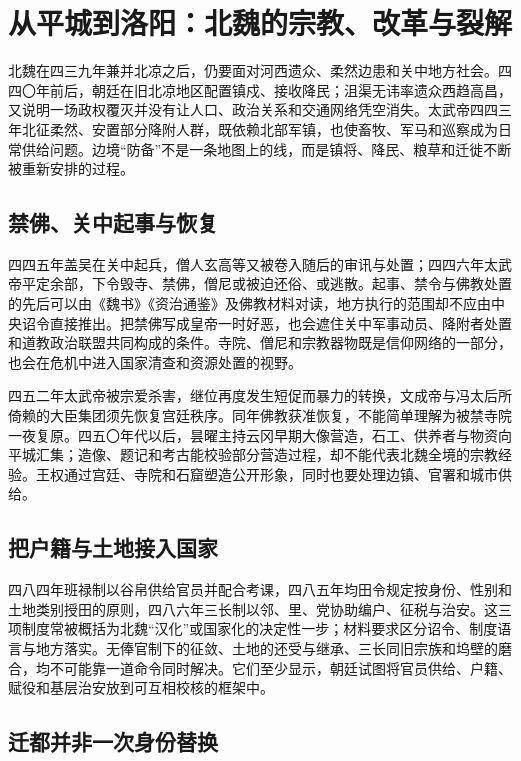 \section{从平城到洛阳：北魏的宗教、改革与裂解}
\label{sec:northern-wei-reform-fracture}

北魏在四三九年兼并北凉之后，仍要面对河西遗众、柔然边患和关中地方社会。四四〇年前后，朝廷在旧北凉地区配置镇戍、接收降民；沮渠无讳率遗众西趋高昌，又说明一场政权覆灭并没有让人口、政治关系和交通网络凭空消失。太武帝四四三年北征柔然、安置部分降附人群，既依赖北部军镇，也使畜牧、军马和巡察成为日常供给问题。边境“防备”不是一条地图上的线，而是镇将、降民、粮草和迁徙不断被重新安排的过程。

\subsection{禁佛、关中起事与恢复}

四四五年盖吴在关中起兵，僧人玄高等又被卷入随后的审讯与处置；四四六年太武帝平定余部，下令毁寺、禁佛，僧尼或被迫还俗、或逃散。起事、禁令与佛教处置的先后可以由《魏书》《资治通鉴》及佛教材料对读，地方执行的范围却不应由中央诏令直接推出。把禁佛写成皇帝一时好恶，也会遮住关中军事动员、降附者处置和道教政治联盟共同构成的条件。寺院、僧尼和宗教器物既是信仰网络的一部分，也会在危机中进入国家清查和资源处置的视野。

四五二年太武帝被宗爱杀害，继位再度发生短促而暴力的转换，文成帝与冯太后所倚赖的大臣集团须先恢复宫廷秩序。同年佛教获准恢复，不能简单理解为被禁寺院一夜复原。四五〇年代以后，昙曜主持云冈早期大像营造，石工、供养者与物资向平城汇集；造像、题记和考古能校验部分营造过程，却不能代表北魏全境的宗教经验。王权通过宫廷、寺院和石窟塑造公开形象，同时也要处理边镇、官署和城市供给。

\subsection{把户籍与土地接入国家}

四八四年班禄制以谷帛供给官员并配合考课，\hypertarget{evt:NSL-440-589-073}{\textcolor{dynasty}{四八五年均田令规定按身份、性别和土地类别授田的原则}}，\hypertarget{evt:NSL-440-589-075}{\textcolor{dynasty}{四八六年三长制以邻、里、党协助编户、征税与治安}}。这三项制度常被概括为北魏“汉化”或国家化的决定性一步；材料要求区分诏令、制度语言与地方落实。无俸官制下的征敛、土地的还受与继承、三长同旧宗族和坞壁的磨合，均不可能靠一道命令同时解决。它们至少显示，朝廷试图将官员供给、户籍、赋役和基层治安放到可互相校核的框架中。

\subsection{迁都并非一次身份替换}

